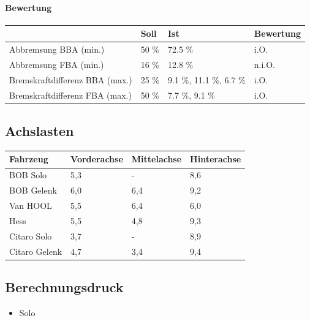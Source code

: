 \documentclass{vorlage-design-main}
\begin{document}
\paragraph{Bewertung}\label{bewertung}

\begin{table}[ht]
  \begin{tabular}{@{}llll@{}}
\toprule
&
Soll
 &
Ist
 &
Bewertung
 \\
\midrule[\heavyrulewidth]
Abbremsung BBA (min.) & 50 \% & 72.5 \% & i.O. \\
Abbremsung FBA (min.) & 16 \% & 12.8 \% & n.i.O. \\
Bremskraftdifferenz BBA (max.) & 25 \% & 9.1 \%, 11.1 \%, 6.7 \% &
i.O. \\
Bremskraftdifferenz FBA (max.) & 50 \% & 7.7 \%, 9.1 \% & i.O. \\
\bottomrule
\end{tabular}%
\end{table}

\subsection{Achslasten}\label{achslasten}

\begin{table}[ht]
  \begin{tabular}{@{}llll@{}}
  \toprule

Fahrzeug & Vorderachse & Mittelachse & Hinterachse \\
\midrule[\heavyrulewidth]
BOB Solo & 5,3 & - & 8,6 \\
BOB Gelenk & 6,0 & 6,4 & 9,2 \\
Van HOOL & 5,5 & 6,4 & 6,0 \\
Hess & 5,5 & 4,8 & 9,3 \\
Citaro Solo & 3,7 & - & 8,9 \\
Citaro Gelenk & 4,7 & 3,4 & 9,4 \\
  \bottomrule
  \end{tabular}%
\end{table}

\subsection{Berechnungsdruck}\label{berechnungsdruck}

\begin{itemize}

\item
  Solo
\end{itemize}
\end{document}

